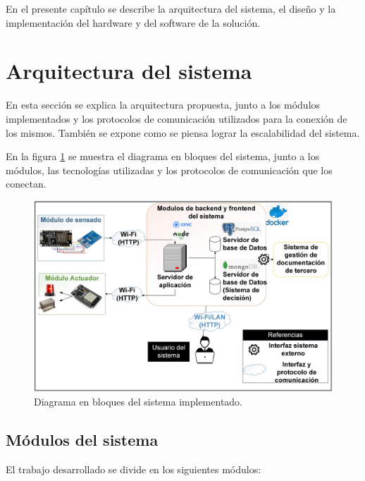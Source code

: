 En el presente capítulo se describe la arquitectura del sistema, el diseño y la implementación del hardware y del software de la solución. 


\section{Arquitectura del sistema}

En esta sección se explica la arquitectura propuesta, junto a los módulos implementados y los protocolos de comunicación utilizados para la conexión de los mismos. También se expone como se piensa lograr la escalabilidad del sistema.

En la figura \ref{fig:tp-final-infra} se muestra el diagrama en bloques del sistema, junto a los módulos, las tecnologías utilizadas y los protocolos de comunicación que los conectan.

\vspace{0.7cm}
\begin{figure}[ht]
	\centering
	\includegraphics[width=1\textwidth]{./Figures/tp-final-infra.jpg}
	\caption{Diagrama en bloques del sistema implementado.}
	\label{fig:tp-final-infra}
\end{figure}

\pagebreak
\subsection{Módulos del sistema}

El trabajo desarrollado se divide en los siguientes módulos:

